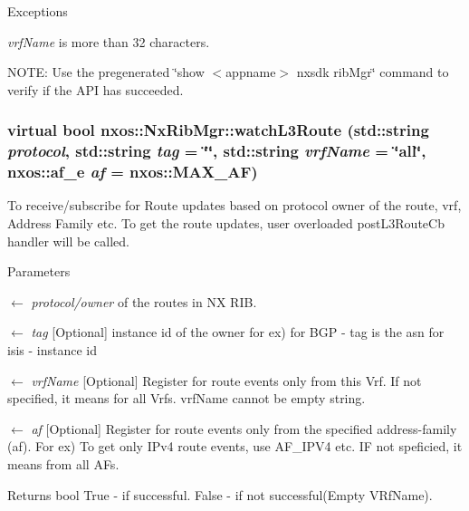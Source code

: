 \begin{DoxyExceptions}{Exceptions}
\item[{\em vrfName}]is more than 32 characters.\end{DoxyExceptions}
NOTE: Use the pregenerated \char`\"{}show $<$appname$>$ nxsdk ribMgr\char`\"{} command to verify if the API has succeeded. \hypertarget{classnxos_1_1NxRibMgr_ab6749ea02f53fc8b2f6cdba21bbc335d}{
\subsubsection[{watchL3Route}]{\setlength{\rightskip}{0pt plus 5cm}virtual bool nxos::NxRibMgr::watchL3Route (std::string {\em protocol}, \/  std::string {\em tag} = {\ttfamily \char`\"{}\char`\"{}}, \/  std::string {\em vrfName} = {\ttfamily \char`\"{}all\char`\"{}}, \/  nxos::af\_\-e {\em af} = {\ttfamily nxos::MAX\_\-AF})}}
\label{classnxos_1_1NxRibMgr_ab6749ea02f53fc8b2f6cdba21bbc335d}
To receive/subscribe for Route updates based on protocol owner of the route, vrf, Address Family etc. To get the route updates, user overloaded postL3RouteCb handler will be called. 
\begin{DoxyParams}{Parameters}
\item[\mbox{$\leftarrow$} {\em protocol/owner}]of the routes in NX RIB. \item[\mbox{$\leftarrow$} {\em tag}]\mbox{[}Optional\mbox{]} instance id of the owner for ex) for BGP -\/ tag is the asn for isis -\/ instance id \item[\mbox{$\leftarrow$} {\em vrfName}]\mbox{[}Optional\mbox{]} Register for route events only from this Vrf. If not specified, it means for all Vrfs. vrfName cannot be empty string. \item[\mbox{$\leftarrow$} {\em af}]\mbox{[}Optional\mbox{]} Register for route events only from the specified address-\/family (af). For ex) To get only IPv4 route events, use AF\_\-IPV4 etc. IF not speficied, it means from all AFs. \end{DoxyParams}
\begin{DoxyReturn}{Returns}
bool True -\/ if successful. False -\/ if not successful(Empty VRfName).
\end{DoxyReturn}

